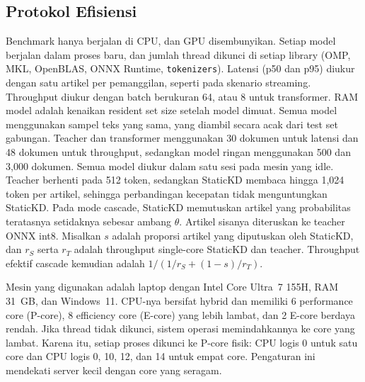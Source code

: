\documentclass[journal]{IEEEtran}
\begin{document}
\subsection{Protokol Efisiensi}
\label{sec:effprotocol}
Benchmark hanya berjalan di CPU, dan GPU disembunyikan. Setiap model berjalan dalam proses baru, dan jumlah thread dikunci di setiap library (OMP, MKL, OpenBLAS, ONNX Runtime, \texttt{tokenizers}). Latensi (p50 dan p95) diukur dengan satu artikel per pemanggilan, seperti pada skenario streaming. Throughput diukur dengan batch berukuran 64, atau 8 untuk transformer. RAM model adalah kenaikan resident set size setelah model dimuat. Semua model menggunakan sampel teks yang sama, yang diambil secara acak dari test set gabungan. Teacher dan transformer menggunakan 30 dokumen untuk latensi dan 48 dokumen untuk throughput, sedangkan model ringan menggunakan 500 dan 3,000 dokumen. Semua model diukur dalam satu sesi pada mesin yang idle. Teacher berhenti pada 512 token, sedangkan StaticKD membaca hingga 1,024 token per artikel, sehingga perbandingan kecepatan tidak menguntungkan StaticKD. Pada mode cascade, StaticKD memutuskan artikel yang probabilitas teratasnya setidaknya sebesar ambang $\theta$. Artikel sisanya diteruskan ke teacher ONNX int8. Misalkan $s$ adalah proporsi artikel yang diputuskan oleh StaticKD, dan $r_S$ serta $r_T$ adalah throughput single-core StaticKD dan teacher. Throughput efektif cascade kemudian adalah $1/(1/r_S+(1-s)/r_T)$.

Mesin yang digunakan adalah laptop dengan Intel Core Ultra~7 155H, RAM 31~GB, dan Windows~11. CPU-nya bersifat hybrid dan memiliki 6 performance core (P-core), 8 efficiency core (E-core) yang lebih lambat, dan 2 E-core berdaya rendah. Jika thread tidak dikunci, sistem operasi memindahkannya ke core yang lambat. Karena itu, setiap proses dikunci ke P-core fisik: CPU logis 0 untuk satu core dan CPU logis 0, 10, 12, dan 14 untuk empat core. Pengaturan ini mendekati server kecil dengan core yang seragam.
\end{document}

